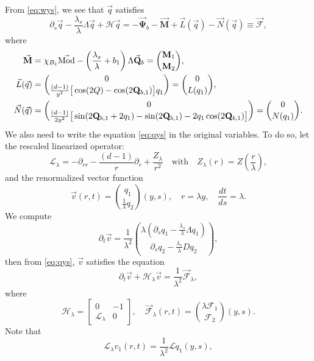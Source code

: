 \documentclass[11pt]{aims}
\theoremstyle{definition}
\numberwithin{equation}{section}
\begin{document}
\medskip

From \eqref{eq:wys}, we see that $\vec q$ satisfies
\begin{equation}\label{eq:qys}
\partial_s \vec q - \frac{\lambda_s}{\lambda} \Lambda \vec q + {\mathscr{H}} \vec q = - \vec{\mathbf{\Psi}}_b  - \vec{\mathbf{M}} + \vec L(\vec q) - \vec N(\vec q) \equiv \vec{\mathcal{F}},
\end{equation}
where 
\begin{align}
\vec{\mathbf{M}} & =  \chi_{B_1}\vec{\textup{Mod}} - \left(\frac{\lambda_s}{\lambda} + b_1\right)\Lambda \vec{\mathbf{Q}}_b = \binom{\mathbf{M}_1}{\mathbf{M}_2}, \label{def:M1M2}\\
\vec L(\vec q) &= \binom{0}{\frac{(d-1)}{y^2}\big[\cos(2Q) - \cos(2\mathbf{Q}_{b,1})\big]q_1} = \binom{0}{L(q_1)},\label{def:Lq}\\
\vec N(\vec q) &= \binom{0}{\frac{(d-1)}{2y^2}\big[\sin(2\mathbf{Q}_{b,1} + 2q_1) - \sin(2\mathbf{Q}_{b,1}) - 2q_1 \cos(2\mathbf{Q}_{b,1}) \big]} = \binom{0}{N(q_1)}.\label{def:Nq}
\end{align}
We also need to write the equation \eqref{eq:qys} in the original variables. To do so, let the rescaled linearized operator:
\begin{equation}\label{def:Llambda}
{\mathscr{L}}_\lambda = - \partial_{rr} - \frac{(d-1)}{r}\partial_r + \frac{Z_\lambda}{r^2} \quad \text{with} \quad Z_\lambda(r) = Z\left(\frac{r}{\lambda}\right),
\end{equation}
and the renormalized vector function
$$\vec v(r,t) = \binom{q_1}{\frac{1}{\lambda}q_2}(y,s), \quad r = \lambda y, \quad \frac{dt}{ds} = \lambda.$$
We compute 
$$\partial_t \vec v = \frac{1}{\lambda^2}\binom{\lambda \left({\partial_s} q_1 - \frac{\lambda_s}{\lambda}\Lambda q_1\right)}{{\partial_s} q_2 - \frac{\lambda_s}{\lambda}Dq_2},$$
then from \eqref{eq:qys}, $\vec v$ satisfies the equation
\begin{equation}\label{eq:vrt}
\partial_t \vec v + {\mathscr{H}}_\lambda \vec v = \frac{1}{\lambda^2}\vec {\mathcal{F}}_\lambda,
\end{equation}
where 
$${\mathscr{H}}_\lambda = \begin{bmatrix}
0 & -1\\ {\mathscr{L}}_\lambda & 0
\end{bmatrix}, \quad \vec {\mathcal{F}}_\lambda(r,t) = \binom{\lambda {\mathcal{F}}_1}{{\mathcal{F}}_2}(y,s).$$
Note that 
\begin{equation}\label{eq:reLLlambda}
{\mathscr{L}}_\lambda v_1(r,t) = \frac{1}{\lambda^2}{\mathscr{L}} q_1(y,s),
\end{equation}
\end{document}
